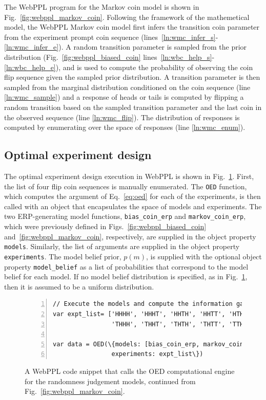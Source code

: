\documentclass[11pt]{article}
\begin{document}
The WebPPL program for the Markov coin model is shown in Fig.~\ref{fig:webppl_markov_coin}.  Following the framework of the mathemetical model, the WebPPL Markov coin model first infers the transition coin parameter from the experiment prompt coin sequence (lines~\ref{ln:wmc_infer_s}-\ref{ln:wmc_infer_e}). A random transition parameter is sampled from the prior distribution (Fig.~\ref{fig:webppl_biased_coin} lines~\ref{ln:wbc_help_s}-\ref{ln:wbc_help_e}), and is used to compute the probability of observing the coin flip sequence given the sampled prior distribution. A transition parameter is then sampled from the marginal distribution conditioned on the coin sequence (line \ref{ln:wmc_sample}) and a response of heads or tails is computed by flipping a random transition based on the sampled transition parameter and the last coin in the observed sequence (line \ref{ln:wmc_flip}). The distribution of responses is computed by enumerating over the space of responses (line \ref{ln:wmc_enum}). 

\subsection{Optimal experiment design}

The optimal experiment design execution in WebPPL is shown in Fig.~\ref{fig:webppl_oed}. First, the list of four flip coin sequences is manually enumerated. The \texttt{OED} function, which computes the argument of Eq.~\ref{eq:oed} for each of the experiments, is then called with an object that encapsulates the space of models and experiments. The two ERP-generating model functions, \texttt{bias\_coin\_erp} and \texttt{markov\_coin\_erp}, which were previously defined in Figs.~\ref{fig:webppl_biased_coin} and~\ref{fig:webppl_markov_coin}, respectively, are supplied in the object property \texttt{models}. Similarly, the list of arguments are supplied in the object property \texttt{experiments}. The model belief prior, $p(m)$, is supplied with the optional object property \texttt{model\_belief} as a list of probabilities that correspond to the model belief for each model. If no model belief distribution is specified, as in Fig.~\ref{fig:webppl_oed}, then it is assumed to be a uniform distribution. 

\begin{figure}[h]
\begin{Verbatim}[numbers=left,numbersep=1pt,frame=single,commandchars=\\\{\},fontfamily=courier,fontsize=\scriptsize,firstnumber=last]
// Execute the models and compute the information gain
var expt_list= ['HHHH', 'HHHT', 'HHTH', 'HHTT', 'HTHH', 'HTHT', 'HTTH', 'HTTT', 
                'THHH', 'THHT', 'THTH', 'THTT', 'TTHH', 'TTHT', 'TTTH', 'TTTT'];

var data = OED(\{models: [bias_coin_erp, markov_coin_erp], 
                experiments: expt_list\})
\end{Verbatim}
\centering
\caption{A WebPPL code snippet that calls the OED computational engine for the randomness judgement models, continued from Fig.~\ref{fig:webppl_markov_coin}.}
\label{fig:webppl_oed}
\end{figure}
\end{document}
